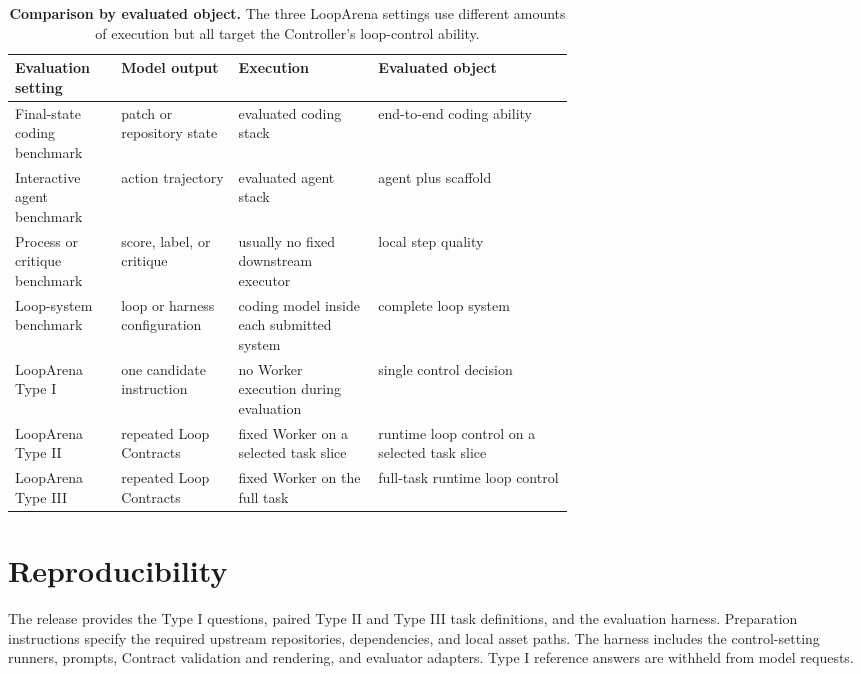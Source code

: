 \begin{table}[H]
\caption{\textbf{Comparison by evaluated object.} The three LoopArena settings use different amounts of execution but all target the Controller's loop-control ability.}
\label{tab:work-lines}
\centering
\footnotesize
\begin{tabularx}{\linewidth}{@{}>{\raggedright\arraybackslash}p{0.19\linewidth}>{\raggedright\arraybackslash}p{0.21\linewidth}>{\raggedright\arraybackslash}p{0.25\linewidth}>{\raggedright\arraybackslash}X@{}}
\toprule
Evaluation setting & Model output & Execution & Evaluated object \\
\midrule
Final-state coding benchmark & patch or repository state & evaluated coding stack & end-to-end coding ability \\
Interactive agent benchmark & action trajectory & evaluated agent stack & agent plus scaffold \\
Process or critique benchmark & score, label, or critique & usually no fixed downstream executor & local step quality \\
Loop-system benchmark & loop or harness configuration & coding model inside each submitted system & complete loop system \\
LoopArena Type I & one candidate instruction & no Worker execution during evaluation & single control decision \\
LoopArena Type II & repeated Loop Contracts & fixed Worker on a selected task slice & runtime loop control on a selected task slice \\
LoopArena Type III & repeated Loop Contracts & fixed Worker on the full task & full-task runtime loop control \\
\bottomrule
\end{tabularx}
\end{table}

\section{Reproducibility}
\label{app:reproducibility}

The release provides the Type I questions, paired Type II and Type III task definitions, and the evaluation harness. Preparation instructions specify the required upstream repositories, dependencies, and local asset paths. The harness includes the control-setting runners, prompts, Contract validation and rendering, and evaluator adapters. Type I reference answers are withheld from model requests.

